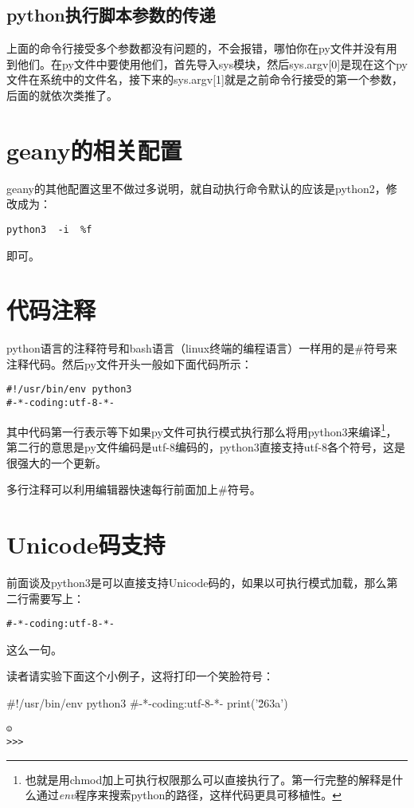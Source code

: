 \documentclass[12pt,oneside]{book}
\begin{document}
\begin{common-format}
\subsection{python执行脚本参数的传递}
上面的命令行接受多个参数都没有问题的，不会报错，哪怕你在py文件并没有用到他们。在py文件中要使用他们，首先导入sys模块，然后sys.argv[0]是现在这个py文件在系统中的文件名，接下来的sys.argv[1]就是之前命令行接受的第一个参数，后面的就依次类推了。


\section{geany的相关配置}
geany的其他配置这里不做过多说明，就自动执行命令默认的应该是python2，修改成为：
\begin{Verbatim}
python3  -i  %f  
\end{Verbatim}
即可。


\section{代码注释}
python语言的注释符号和bash语言（linux终端的编程语言）一样用的是\#{}符号来注释代码。然后py文件开头一般如下面代码所示：
\begin{Verbatim}
#!/usr/bin/env python3
#-*-coding:utf-8-*-
\end{Verbatim}
其中代码第一行表示等下如果py文件可执行模式执行那么将用python3来编译\footnote{也就是用chmod加上可执行权限那么可以直接执行了。第一行完整的解释是什么通过\textit{env}程序来搜索python的路径，这样代码更具可移植性。}，第二行的意思是py文件编码是utf-8编码的，python3直接支持utf-8各个符号，这是很强大的一个更新。

多行注释可以利用编辑器快速每行前面加上\#{}符号。

\section{Unicode码支持}
前面谈及python3是可以直接支持Unicode码的，如果以可执行模式加载，那么第二行需要写上：
\begin{Verbatim}
#-*-coding:utf-8-*-
\end{Verbatim}
这么一句。

读者请实验下面这个小例子，这将打印一个笑脸符号：
\begin{tcbpython}[]
#!/usr/bin/env python3
#-*-coding:utf-8-*-
print('\u263a')
\end{tcbpython}

\begin{Verbatim}
☺
>>> 
\end{Verbatim}



\end{common-format}
\end{document}
